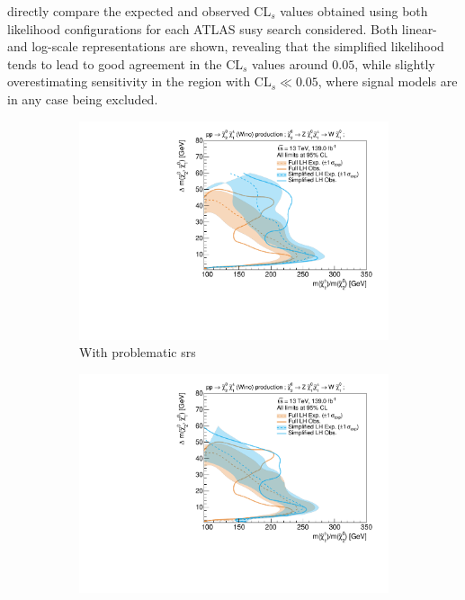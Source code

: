 directly compare the expected and observed CL$_s$ values obtained using both likelihood configurations for each ATLAS \gls{susy} search considered. Both linear- and log-scale representations are shown, revealing that the simplified likelihood tends to lead to good agreement in the CL$_s$ values around $0.05$, while slightly overestimating sensitivity in the region with CL$_s \ll 0.05$, where signal models are in any case being excluded.
\begin{figure}[H]
	\centering
	\captionsetup[subfigure]{aboveskip=-3pt,belowskip=-2pt}
	\begin{subfigure}[b]{0.47\textwidth}
		\centering\includegraphics[width=\textwidth]{exclusion_compressed_noCRs_noLabel_v3}
		\caption{With problematic \glspl{sr}\label{fig:exclusion_compressed_CLs_noLabel_v2_withCRs}}
	\end{subfigure}\hfill
	\begin{subfigure}[b]{0.47\textwidth}
		\centering\includegraphics[width=\textwidth]{exclusion_compressed_noLabel_v3}

\end{subfigure}
\end{figure}
